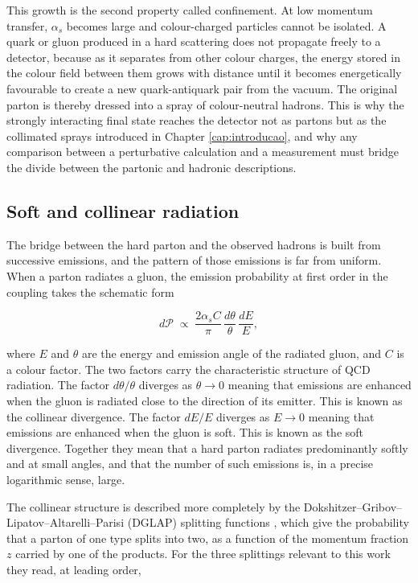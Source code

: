 This growth is the second property called confinement. At low momentum transfer,
$\alpha_s$ becomes large and colour-charged particles cannot be isolated. A
quark or gluon produced in a hard scattering does not propagate freely to a detector,
because as it separates from other colour charges, the energy stored in the colour field
between them grows with distance until it becomes energetically favourable to create
a new quark-antiquark pair from the vacuum. The original parton is thereby
dressed into a spray of colour-neutral hadrons. This is why the strongly interacting
final state reaches the detector not as partons but as the collimated sprays introduced
in Chapter \ref{cap:introducao}, and why any comparison between a perturbative
calculation and a measurement must bridge the divide between the partonic and hadronic
descriptions.

\subsection{Soft and collinear radiation}

The bridge between the hard parton and the observed hadrons is built from
successive emissions, and the pattern of those emissions is far from uniform.
When a parton radiates a gluon, the emission probability at first order in the
coupling takes the schematic form

\begin{equation}
  d\mathcal{P} \;\propto\; \frac{2\alpha_s C}{\pi}\,
  \frac{d\theta}{\theta}\,\frac{dE}{E},
  \label{eq:soft-collinear}
\end{equation}

where $E$ and $\theta$ are the energy and emission angle of the radiated gluon,
and $C$ is a colour factor. The two factors carry the characteristic structure of
QCD radiation. The factor $d\theta/\theta$ diverges as $\theta \to 0$ meaning that
emissions are enhanced when the gluon is radiated close to the direction of its emitter.
This is known as the collinear divergence. The factor $dE/E$ diverges as $E \to 0$
meaning that emissions are enhanced when the gluon is soft. This is known
as the soft divergence. Together they mean that a hard parton radiates predominantly
softly and at small angles, and that the number of such emissions is,
in a precise logarithmic sense, large.

The collinear structure is described more completely by the 
Dokshitzer–Gribov–Lipatov–Altarelli–Parisi (DGLAP) splitting
functions \cite{Ellis:1996mzs}, which give the probability that a parton of one type splits into two,
as a function of the momentum fraction $z$ carried by one of the products. For
the three splittings relevant to this work they read, at leading order,


